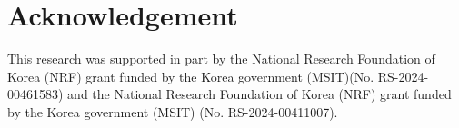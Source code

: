 \documentclass[manuscript,screen,review]{acmart}
\begin{document}


\maketitle










\section*{Acknowledgement}
This research was supported in part by the National Research Foundation of Korea (NRF) grant funded by the Korea government (MSIT)(No. RS-2024-00461583) and the National Research Foundation of Korea (NRF) grant funded by the Korea government (MSIT) (No. RS-2024-00411007).




\begin{appendices}





\end{appendices}
\end{document}
